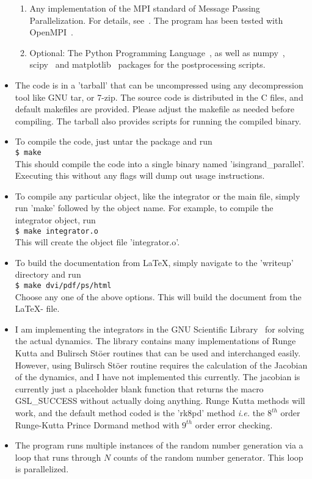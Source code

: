 \documentclass[a4paper,10pt]{article}
\newcommand{\shellcmd}[1]{\\\indent\indent\texttt{\footnotesize\$ #1}\\}
\begin{document}
\begin{itemize}
\begin{enumerate}
  \item
  Any implementation of the MPI standard of Message Passing Parallelization. For details, see~\cite{mpi}. The program has been tested with OpenMPI~\cite{openmpi}.
\item
 Optional: The Python Programming Language~\cite{python}, as well as numpy~\cite{numpy}, scipy~\cite{scipy} and matplotlib~\cite{matplotlib} packages for the postprocessing scripts.
 \end{enumerate}
 \item
 The code is in a 'tarball' that can be uncompressed using any decompression tool like GNU tar, or 7-zip. The source code is distributed in the C files, and default makefiles are provided. Please adjust the makefile as needed before compiling. The tarball also provides scripts for running the compiled binary.
 \item
 To compile the code, just untar the package and run  
 \shellcmd{make}
 This should compile the code into a single binary named 'isingrand\_parallel'. Executing this without any flags will dump out usage instructions.  
 \item
 To compile any particular object, like the integrator or the main file, simply run 'make' followed by the object name. For example, to compile the integrator object, run
 \shellcmd{make integrator.o}
 This will create the object file 'integrator.o'.
 \item
 To build the documentation from \LaTeX , simply navigate to the 'writeup' directory and run
 \shellcmd{make dvi/pdf/ps/html}
 Choose any one of the above options. This will build the document from the \LaTeX - file.
 \item
  I am implementing the integrators in the GNU Scientific Library~\cite{galassi:gsl} for solving the actual dynamics. The library contains many implementations of Runge Kutta and Bulirsch St\"oer routines that can be used and interchanged easily. However, using Bulirsch St\"oer routine requires the calculation of the Jacobian of the dynamics, and I have not implemented this currently. The jacobian is currently just a placeholder blank function that returns the macro GSL\_SUCCESS without actually doing anything. Runge Kutta methods will work, and the default method coded is the 'rk8pd' method \textit{i.e.} the $8^{th}$ order Runge-Kutta Prince Dormand method with $9^{th}$ order error checking.
\item
 The program runs multiple instances of the random number generation via a loop that runs through $N$ counts of the random number generator. This loop is parallelized.

\end{itemize}
\end{document}
